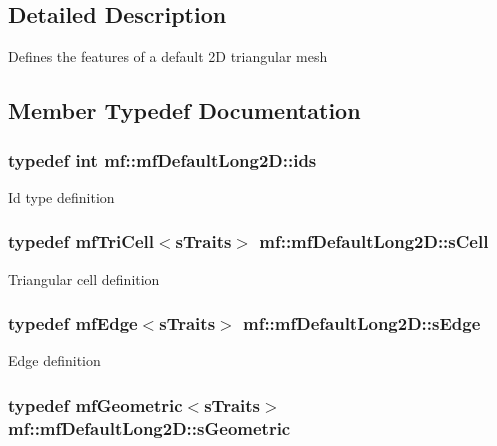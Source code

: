 \subsection{Detailed Description}
Defines the features of a default 2D triangular mesh 

\subsection{Member Typedef Documentation}
\hypertarget{structmf_1_1mfDefaultLong2D_a6f6d35da9a8b9da95d234e5cdb611000}{
\subsubsection[{ids}]{\setlength{\rightskip}{0pt plus 5cm}typedef int {\bf mf::mfDefaultLong2D::ids}}}
\label{structmf_1_1mfDefaultLong2D_a6f6d35da9a8b9da95d234e5cdb611000}
Id type definition \hypertarget{structmf_1_1mfDefaultLong2D_a93ac50a18a452a443b21b746d039df7d}{
\subsubsection[{sCell}]{\setlength{\rightskip}{0pt plus 5cm}typedef {\bf mfTriCell}$<${\bf sTraits}$>$ {\bf mf::mfDefaultLong2D::sCell}}}
\label{structmf_1_1mfDefaultLong2D_a93ac50a18a452a443b21b746d039df7d}
Triangular cell definition \hypertarget{structmf_1_1mfDefaultLong2D_aa36c3fbc0e11ba06bd957e272d23030d}{
\subsubsection[{sEdge}]{\setlength{\rightskip}{0pt plus 5cm}typedef {\bf mfEdge}$<${\bf sTraits}$>$ {\bf mf::mfDefaultLong2D::sEdge}}}
\label{structmf_1_1mfDefaultLong2D_aa36c3fbc0e11ba06bd957e272d23030d}
Edge definition \hypertarget{structmf_1_1mfDefaultLong2D_aa689949101848a8cc3ec832e0ddab81b}{
\subsubsection[{sGeometric}]{\setlength{\rightskip}{0pt plus 5cm}typedef {\bf mfGeometric}$<${\bf sTraits}$>$ {\bf mf::mfDefaultLong2D::sGeometric}}}
